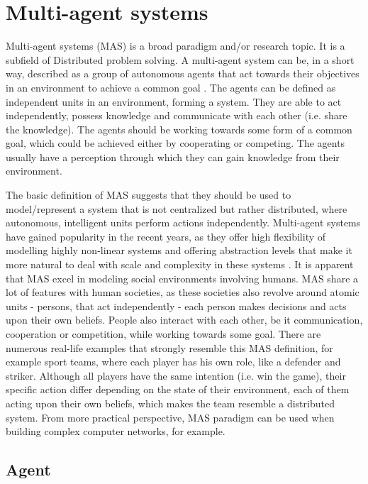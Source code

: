 \documentclass[main.tex]{subfiles}
\begin{document}
\section{Multi-agent systems} \label{sec-mas}

Multi-agent systems (MAS) is a broad paradigm and/or research topic. It is a subfield of Distributed
problem solving. A multi-agent system can be, in a short way, described as a group
of autonomous agents that act towards their objectives in an environment to achieve a common goal
\cite{ParasumannaGokulan2010}. The agents can be defined as independent units in
an environment, forming a system. They are able to act independently, possess
knowledge and communicate with each other (i.e. share the knowledge). The agents
should be working towards some form of a common goal, which could be achieved
either by cooperating or competing.  The agents usually have a perception
through which they can gain knowledge from their environment.

The basic definition of MAS suggests that they should be used to model/represent
a system that is not centralized but rather distributed, where autonomous, intelligent units perform
actions independently. Multi-agent systems have gained popularity in the recent years, as they
offer high flexibility of modelling highly non-linear systems and offering abstraction levels that
make it more natural to deal with scale and complexity in these systems
\cite{Burmeister1997ApplicationOM}. It is apparent that MAS excel in modeling social environments
involving humans. MAS share a lot of features with human societies, as these societies also revolve
around atomic units - persons, that act independently - each person makes decisions and acts upon
their own beliefs. People also interact with each other, be it communication, cooperation or
competition, while working towards some goal. There are numerous real-life examples that strongly
resemble this MAS definition, for example sport teams, where each player has his own role, like
a defender and striker. Although all players have the same intention (i.e. win the game), their
specific action differ depending on the state of their environment, each of them acting upon their
own beliefs, which makes the team resemble a distributed system. From more practical perspective,
MAS paradigm can be used when building complex computer networks, for example.

\subsection{Agent}
\end{document}
